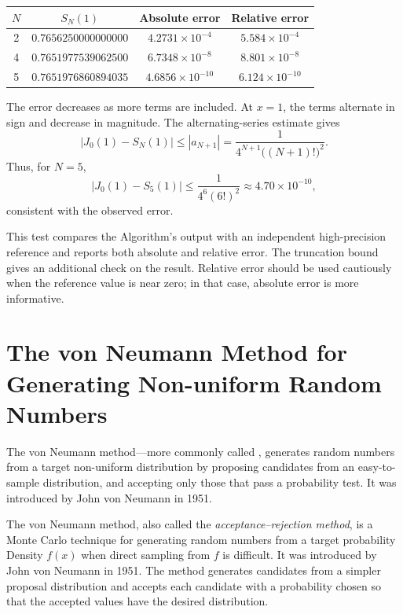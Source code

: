 \documentclass[a4paper, 10pt, onepage]{elegantbook}
\begin{document}
{\begin{center}
\begin{tabular}{cccc}
\toprule
\(N\) & \(S_N(1)\) & Absolute error & Relative error \\
\midrule
2 & \(0.7656250000000000\)
  & \(4.2731\times 10^{-4}\)
  & \(5.584\times 10^{-4}\) \\
4 & \(0.7651977539062500\)
  & \(6.7348\times 10^{-8}\)
  & \(8.801\times 10^{-8}\) \\
5 & \(0.7651976860894035\)
  & \(4.6856\times 10^{-10}\)
  & \(6.124\times 10^{-10}\) \\
\bottomrule
\end{tabular}
\end{center}

The error decreases as more terms are included. At \(x=1\), the terms
alternate in sign and decrease in magnitude. The alternating-series
estimate gives
\[
\left|J_0(1)-S_N(1)\right|
\leq |a_{N+1}|
=
\frac{1}{4^{N+1}\bigl((N+1)!\bigr)^2}.
\]
Thus, for \(N=5\),
\[
\left|J_0(1)-S_5(1)\right|
\leq
\frac{1}{4^6(6!)^2}
\approx 4.70\times 10^{-10},
\]
consistent with the observed error.  

This test compares the Algorithm's output with an independent
high-precision reference and reports both absolute and relative error.
The truncation bound gives an additional check on the result. Relative
error should be used cautiously when the reference value is near zero;
in that case, absolute error is more informative.

\newpage



\section{The von Neumann Method for Generating Non-uniform Random Numbers}

\noindent

The von Neumann method—more commonly called , 
generates random numbers from a target non-uniform distribution by proposing candidates from an easy-to-sample 
distribution,
 and accepting only those that pass a probability test. It was introduced by John von Neumann in 1951.  

The von Neumann method, also called the \emph{acceptance--rejection method},
is a Monte Carlo technique for generating random numbers from a target
probability Density \(f(x)\) when direct sampling from \(f\) is difficult.
It was introduced by John von Neumann in 1951. The method generates
candidates from a simpler proposal distribution and accepts each candidate
with a probability chosen so that the accepted values have the desired
distribution.

}
\end{document}
